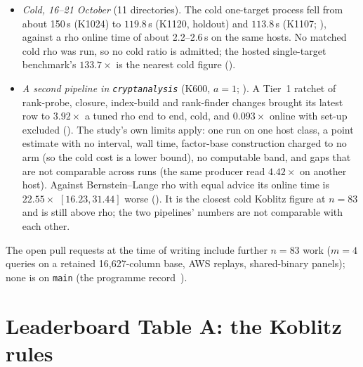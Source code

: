 \begin{itemize}
  memory was faster online in every pair run: IC/rho $3.74$
  $[2.65,11.05]$ (K3300, time-matched), $40.61$ (K3300, memory-matched),
  and $81.5$--$395.5$ (K600)
  (). Only the K3300 and
  K600 bases were paired; the K3072 reading was not, so its retirement rests
  on the same mechanism rather than on its own measurement. The validation
  sweep and the ledger audit retired all the online readings on 19--20
  October.
\item \emph{Cold, 16--21 October} (11 directories). The cold one-target
  process fell from about 150\,s (K1024) to $119.8$\,s (K1120, holdout) and
  $113.8$\,s (K1107; ), against
  a rho online time of about 2.2--2.6\,s on the same hosts. No matched cold
  rho was run, so no cold ratio is admitted; the hosted single-target
  benchmark's $133.7\times$ is the nearest cold figure
  ().
\item \emph{A second pipeline in \texttt{cryptanalysis}} (K600, $a=1$;
  \cite{icprogram2026}). A Tier~1 ratchet of rank-probe, closure,
  index-build and rank-finder changes brought its latest row to $3.92\times$
  a tuned rho end to end, cold, and $0.093\times$ online with set-up
  excluded ().
  The study's own limits apply: one run on one host class, a point estimate
  with no interval, wall time, factor-base construction charged to no arm (so
  the cold cost is a lower bound), no computable band, and gaps that are not
  comparable across runs (the same producer read $4.42\times$ on another host).
  Against Bernstein--Lange rho with equal advice its online time is
  $22.55\times$ $[16.23,31.44]$ worse
  (). It is the
  closest cold Koblitz figure at $n=83$ and is still above rho; the two
  pipelines' numbers are not comparable with each other.
\end{itemize}
The open pull requests at the time of writing include further $n=83$ work
($m=4$ queries on a retained 16{,}627-column base, AWS replays, shared-binary
panels); none is on \texttt{main} (the programme record~\cite{icprogram2026}).

\section{Leaderboard Table A: the Koblitz rules}\label{sec:tablea}

